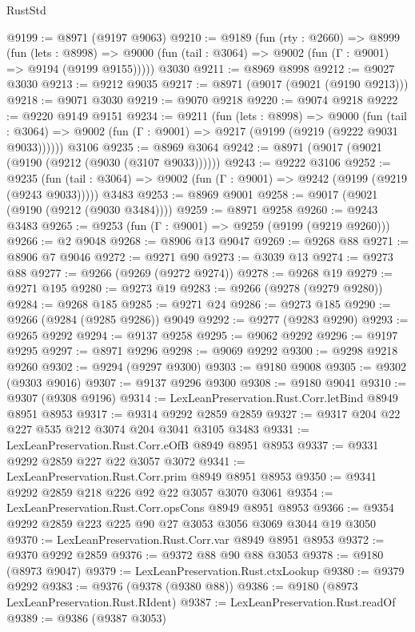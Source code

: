 \begin{lexlean}{RustStd}
\begin{coremodule}
@9199 := @8971 (@9197 @9063)
@9210 := @9189
    (fun (rty : @2660) =>
    @8999
      (fun (lets : @8998) =>
      @9000 (fun (tail : @3064) => @9002 (fun (Γ : @9001) => @9194 (@9199 @9155)))))
    @3030
@9211 := @8969 @8998
@9212 := @9027 @3030
@9213 := @9212 @9035
@9217 := @8971 (@9017 (@9021 (@9190 @9213)))
@9218 := @9071 @3030
@9219 := @9070 @9218
@9220 := @9074 @9218
@9222 := @9220 @9149 @9151
@9234 := @9211
    (fun (lets : @8998) =>
    @9000
      (fun (tail : @3064) => @9002 (fun (Γ : @9001) => @9217 (@9199 (@9219 (@9222 @9031 @9033))))))
    @3106
@9235 := @8969 @3064
@9242 := @8971 (@9017 (@9021 (@9190 (@9212 (@9030 (@3107 @9033))))))
@9243 := @9222 @3106
@9252 := @9235
    (fun (tail : @3064) => @9002 (fun (Γ : @9001) => @9242 (@9199 (@9219 (@9243 @9033)))))
    @3483
@9253 := @8969 @9001
@9258 := @9017 (@9021 (@9190 (@9212 (@9030 @3484))))
@9259 := @8971 @9258
@9260 := @9243 @3483
@9265 := @9253 (fun (Γ : @9001) => @9259 (@9199 (@9219 @9260)))
@9266 := @2 @9048
@9268 := @8906 @13 @9047
@9269 := @9268 @88
@9271 := @8906 @7 @9046
@9272 := @9271 @90
@9273 := @3039 @13
@9274 := @9273 @88
@9277 := @9266 (@9269 (@9272 @9274))
@9278 := @9268 @19
@9279 := @9271 @195
@9280 := @9273 @19
@9283 := @9266 (@9278 (@9279 @9280))
@9284 := @9268 @185
@9285 := @9271 @24
@9286 := @9273 @185
@9290 := @9266 (@9284 (@9285 @9286)) @9049
@9292 := @9277 (@9283 @9290)
@9293 := @9265 @9292
@9294 := @9137 @9258
@9295 := @9062 @9292
@9296 := @9197 @9295
@9297 := @8971 @9296
@9298 := @9069 @9292
@9300 := @9298 @9218 @9260
@9302 := @9294 (@9297 @9300)
@9303 := @9180 @9008
@9305 := @9302 (@9303 @9016)
@9307 := @9137 @9296 @9300
@9308 := @9180 @9041
@9310 := @9307 (@9308 @9196)
@9314 := LexLeanPreservation.Rust.Corr.letBind @8949 @8951 @8953
@9317 := @9314 @9292 @2859 @2859
@9327 := @9317 @204 @22 @227 @535 @212 @3074 @204 @3041 @3105 @3483
@9331 := LexLeanPreservation.Rust.Corr.eOfB @8949 @8951 @8953
@9337 := @9331 @9292 @2859 @227 @22 @3057 @3072
@9341 := LexLeanPreservation.Rust.Corr.prim @8949 @8951 @8953
@9350 := @9341 @9292 @2859 @218 @226 @92 @22 @3057 @3070 @3061
@9354 := LexLeanPreservation.Rust.Corr.opsCons @8949 @8951 @8953
@9366 := @9354 @9292 @2859 @223 @225 @90 @27 @3053 @3056 @3069 @3044 @19 @3050
@9370 := LexLeanPreservation.Rust.Corr.var @8949 @8951 @8953
@9372 := @9370 @9292 @2859
@9376 := @9372 @88 @90 @88 @3053
@9378 := @9180 (@8973 @9047)
@9379 := LexLeanPreservation.Rust.ctxLookup
@9380 := @9379 @9292
@9383 := @9376 (@9378 (@9380 @88))
@9386 := @9180 (@8973 LexLeanPreservation.Rust.RIdent)
@9387 := LexLeanPreservation.Rust.readOf
@9389 := @9386 (@9387 @3053)

\end{coremodule}
\end{lexlean}
